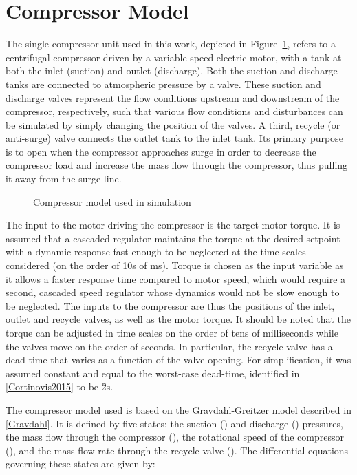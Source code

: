 \section{Compressor Model}
\label{sec:mod:comp}

The single compressor unit used in this work, depicted in Figure~\ref{fig:mod:single_comp}, refers to a centrifugal compressor driven by a variable-speed electric motor, with a tank at both the inlet (suction) and outlet (discharge).
Both the suction and discharge tanks are connected to atmospheric pressure by a valve.
These suction and discharge valves represent the flow conditions upstream and downstream of the compressor, respectively, such that various flow conditions and disturbances can be simulated by simply changing the position of the valves.
A third, recycle (or anti-surge) valve connects the outlet tank to the inlet tank. Its primary purpose is to open when the compressor approaches surge in order to decrease the compressor load and increase the mass flow through the compressor, thus pulling it away from the surge line.

\begin{figure}
  \centering
  \resizebox{0.7\linewidth}{!}{%
    \begin{tikzpicture}
      \drawcomp
    \end{tikzpicture}
  }
  \caption{Compressor model used in simulation}
  \label{fig:mod:single_comp}
\end{figure}


The input to the motor driving the compressor is the target motor torque.
It is assumed that a cascaded regulator maintains the torque at the desired setpoint with a dynamic response fast enough to be neglected at the time scales considered (on the order of 10s of ms).
Torque is chosen as the input variable as it allows a faster response time compared to motor speed, which would require a second, cascaded speed regulator whose dynamics would not be slow enough to be neglected.
The inputs to the compressor are thus the positions of the inlet, outlet and recycle valves, as well as the motor torque.
It should be noted that the torque can be adjusted in time scales on the order of tens of milliseconds while the valves move on the order of seconds.
In particular, the recycle valve has a dead time that varies as a function of the valve opening. For simplification, it was assumed constant and equal to the worst-case dead-time, identified in \ref{Cortinovis2015} to be \u{2}{s}.


The compressor model used is based on the Gravdahl-Greitzer model described in \ref{Gravdahl}. It is defined by five states: the suction () and discharge () pressures, the mass flow through the compressor (), the rotational speed of the compressor (), and the mass flow rate through the recycle valve ().
The differential equations governing these states are given by:


